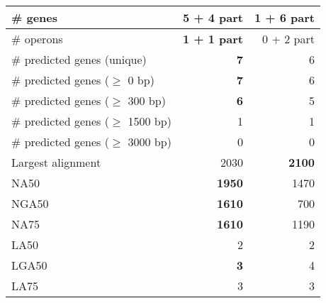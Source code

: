 \documentclass[12pt,a4paper]{article}
\begin{document}
\begin{table}[ht]
\begin{center}
\begin{tabular}{|l*{2}{|r}|}
\# genes & {\bf 5 + 4 part} & 1 + 6 part \\ \hline
\# operons & {\bf 1 + 1 part} & 0 + 2 part \\ \hline
\# predicted genes (unique) & {\bf 7} & 6 \\ \hline
\# predicted genes ($\geq$ 0 bp) & {\bf 7} & 6 \\ \hline
\# predicted genes ($\geq$ 300 bp) & {\bf 6} & 5 \\ \hline
\# predicted genes ($\geq$ 1500 bp) & 1 & 1 \\ \hline
\# predicted genes ($\geq$ 3000 bp) & 0 & 0 \\ \hline
Largest alignment & 2030 & {\bf 2100} \\ \hline
NA50 & {\bf 1950} & 1470 \\ \hline
NGA50 & {\bf 1610} & 700 \\ \hline
NA75 & {\bf 1610} & 1190 \\ \hline
LA50 & 2 & 2 \\ \hline
LGA50 & {\bf 3} & 4 \\ \hline
LA75 & 3 & 3 \\ \hline
\end{tabular}
\end{center}
\end{table}
\end{document}
